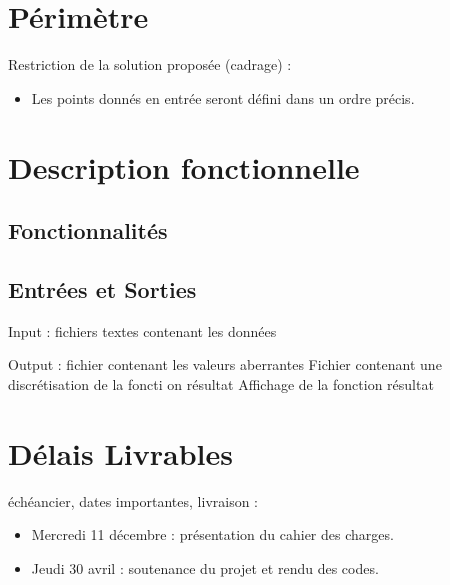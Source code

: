 \documentclass[a4paper,12pt]{article}
\begin{document}
\newpage
\section{Périmètre}

Restriction de la solution proposée (cadrage) :
\begin{itemize}
\item Les points donnés en entrée seront défini dans un ordre précis.
\end{itemize}

\newpage
\section{Description fonctionnelle}

\subsection{Fonctionnalités}
\label{Fonctions}


\subsection{Entrées et Sorties}

Input : fichiers textes contenant les données

Output : fichier contenant les valeurs aberrantes
	   Fichier contenant une discrétisation de la foncti on résultat
	   Affichage de la fonction résultat

\newpage
\section{Délais Livrables}

échéancier, dates importantes, livraison :
\begin{itemize}
\item Mercredi 11 décembre : présentation du cahier des charges.
\item Jeudi 30 avril : soutenance du projet et rendu des codes.
\end{itemize}
\end{document}
